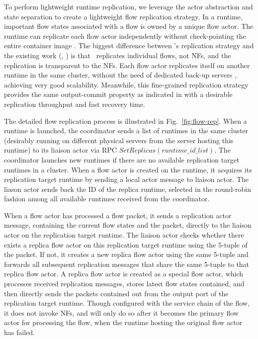 To perform lightweight runtime replication, we leverage the actor
abstraction and state separation to create a lightweight flow replication
strategy. In a runtime, important flow states associated with a flow is
owned by a unique flow actor. The runtime can replicate each flow actor
independently without check-pointing the entire
container image \cite{sherry2015rollback, rajagopalan2013pico}.  %
 The biggest difference between \nfactor's replication strategy and the existing work (\eg, \cite{sherry2015rollback}) is that \nfactor~replicates individual flows, not NFs, and the replication is transparent to the NFs. %
Each flow actor replicates itself on another runtime in the same cluster, without the need of dedicated back-up servers \cite{sherry2015rollback}, achieving very good scalability.
Meanwhile, this fine-grained replication strategy provides the same output-commit property as indicated in \cite{sherry2015rollback} with a desirable replication throughput and fast recovery time.


The detailed flow replication process is illustrated in Fig.~\ref{fig:flow-rep}. When a runtime is launched, the coordinator sends a list of runtimes in the same cluster (desirably running on different physical servers from the server hosting this runtime) to its liaison actor via RPC $SetReplicas(runtime\_id\_list)$. %
The coordinator launches new runtimes if there are no available replication target runtimes in a cluster.   When a flow actor is created on the runtime, it acquires its replication target runtime by sending a local actor message to liaison actor. The liason actor sends back the ID of the replica runtime, selected in the round-robin fashion among all available runtimes received from the coordinator. %

When a flow actor has processed a flow packet, it sends a replication actor message, containing the current flow states and the packet, directly to the liaison actor on the replication target runtime. The liaison actor checks whether there exists a replica flow actor on this replication target runtime using the 5-tuple of the packet. If not, it creates a new replica flow actor using the same 5-tuple and forwards all subsequent replication messages that share the same 5-tuple to that replica flow actor. A replica flow actor is created as a special flow actor, which processes received replication messages, stores latest flow states contained, and then directly sends the packets contained out from the output port of the replication target runtime. Though configured with the service chain of the flow, it does not invoke NFs, and will only do so after it becomes the primary flow actor for processing the flow, when the runtime hosting the original flow actor has failed.


